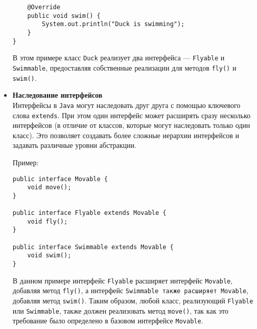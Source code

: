 \begin{itemize}
\begin{verbatim}
    @Override
    public void swim() {
        System.out.println("Duck is swimming");
    }
}
    \end{verbatim}
    В этом примере класс \texttt{Duck} реализует два интерфейса — \texttt{Flyable} и \texttt{Swimmable}, предоставляя собственные реализации для методов \texttt{fly()} и \texttt{swim()}.


    \item \textbf{Наследование интерфейсов} \\
    Интерфейсы в \texttt{Java} могут наследовать друг друга с помощью ключевого слова \texttt{extends}. При этом один интерфейс может расширять сразу несколько интерфейсов (в отличие от классов, которые могут наследовать только один класс). Это позволяет создавать более сложные иерархии интерфейсов и задавать различные уровни абстракции.

    Пример:
    \begin{verbatim}
public interface Movable {
    void move();
}

public interface Flyable extends Movable {
    void fly();
}

public interface Swimmable extends Movable {
    void swim();
}
    \end{verbatim}
    В данном примере интерфейс \texttt{Flyable} расширяет интерфейс \texttt{Movable}, добавляя метод \texttt{fly()}, а интерфейс \texttt{Swimmable также расширяет \texttt{Movable}}, добавляя метод \texttt{swim()}. Таким образом, любой класс, реализующий \texttt{Flyable} или \texttt{Swimmable}, также должен реализовать метод \texttt{move()}, так как это требование было определено в базовом интерфейсе \texttt{Movable}.
\end{itemize}

